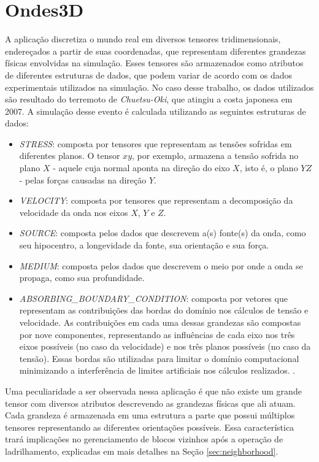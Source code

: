 \documentclass[cic,tc]{iiufrgs}
\begin{document}
\section{Ondes3D}
A aplicação discretiza o mundo real em diversos tensores tridimensionais, endereçados a partir de suas coordenadas, que representam diferentes grandezas físicas envolvidas
na simulação. Esses tensores são armazenados como atributos de diferentes estruturas de dados, que podem variar de acordo com os dados experimentais utilizados na simulação. No caso
desse trabalho, os dados utilizados são resultado do terremoto de \textit{Chuetsu-Oki}, que atingiu a costa japonesa em 2007. A simulação desse evento é calculada utilizando as
seguintes estruturas de dados:

\begin{itemize}
\item{\textit{STRESS}:} composta por tensores que representam as tensões sofridas em diferentes planos. O tensor $xy$, por exemplo, armazena a tensão sofrida no plano
  $X$ - aquele cuja normal aponta na direção do eixo $X$, isto é, o plano $YZ$ - pelas forças causadas na direção $Y$.
\item{\textit{VELOCITY}:} composta por tensores que representam a decomposição da velocidade da onda nos eixos $X$, $Y$ e $Z$.
\item{\textit{SOURCE}:} composta pelos dados que descrevem a(s) fonte(s) da onda, como seu hipocentro, a longevidade da fonte, sua orientação e sua força.
\item{\textit{MEDIUM}:} composta pelos dados que descrevem o meio por onde a onda se propaga, como sua profundidade.
\item{\textit{ABSORBING\_BOUNDARY\_CONDITION}:} composta por vetores que representam as contribuições das bordas do domínio nos cálculos
  de tensão e velocidade. As contribuições em cada uma dessas grandezas são compostas por nove componentes, representando as influências de
  cada eixo nos três eixos possíveis (no caso da velocidade) e nos três planos possíveis (no caso da tensão). Essas bordas são utilizadas
  para limitar o domínio computacional minimizando a interferência de limites artificiais nos cálculos realizados. \cite{ABCarticle}. 
\end{itemize}

Uma peculiaridade a ser observada nessa aplicação é que não existe um grande tensor com diversos atributos descrevendo as grandezas físicas que ali atuam. Cada grandeza é armazenada em uma estrutura a parte que possui múltiplos tensores representando as diferentes orientações possíveis. Essa característica trará implicações no gerenciamento de blocos
vizinhos após a operação de ladrilhamento, explicadas em mais detalhes na Seção \ref{sec:neighborhood}.
\end{document}
